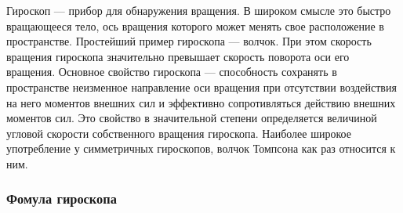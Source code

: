 \documentclass[a4paper, 12pt]{article}
\begin{document}
Гироскоп —  прибор для обнаружения вращения. В широком смысле это быстро вращающееся тело, ось вращения которого может менять свое расположение в пространстве. Простейший пример гироскопа — волчок.\newline
При этом скорость вращения гироскопа значительно превышает скорость поворота оси его вращения. Основное свойство гироскопа — способность сохранять в пространстве неизменное направление оси вращения при отсутствии воздействия на него моментов внешних сил и эффективно сопротивляться действию внешних моментов сил. Это свойство в значительной степени определяется величиной угловой скорости собственного вращения гироскопа.\newline
Наиболее широкое употребление у симметричных гироскопов, волчок Томпсона как раз относится к ним.
\begin{figure}	
 \end{figure}

\subsubsection{Фомула гироскопа}
\end{document}
